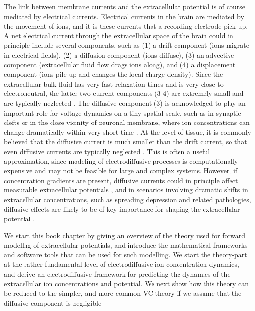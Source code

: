 \documentclass[preprint,11pt,authoryear]{elsarticle}
\begin{document}
The link between membrane currents and the extracellular potential is of course mediated by electrical currents. Electrical currents in the brain are mediated by the movement of ions, and it is these currents that a recording electrode pick up.  A net electrical current through the extracellular space of the brain could in principle include several components, such as (1) a drift component (ions migrate in electrical fields), (2) a diffusion component (ions diffuse), (3) an advective component (extracellular fluid flow drags ions along), and (4) a displacement component (ions pile up and changes the local charge density). Since the extracellular bulk fluid has very fast relaxation times and is very close to electroneutral, the latter two current components (3-4) are extremely small and are typically neglected \citep{Grodzinsky2011, Gratiy2017}. The diffusive component (3) is acknowledged to play an important role for voltage dynamics on a tiny spatial scale, such as in synaptic clefts or in the close vicinity of neuronal membrane, where ion concentrations can change dramatically within very short time \citep{Savtchenko2017, Pods2017}. At the level of tissue, it is commonly believed that the diffusive current is much smaller than the drift current, so that even diffusive currents are typically neglected \citep{Holt1999, Pettersen2008a}. This is often a useful approximation, since modeling of electrodiffusive processes is computationally expensive and may not be feasible for large and complex systems. However, if concentration gradients are present, diffusive currents could in principle affect measurable extracellular potentials \citep{Halnes2016, Halnes2017, Solbra2018}, and in scenarios involving dramatic shifts in extracellular concentrations, such as spreading depression and related pathologies, diffusive effects are likely to be of key importance for shaping the extracellular potential \citep{Almeida2004, OConnell2016}.

We start this book chapter by giving an overview of the theory used for forward modellng of extracellular potentials, and introduce the mathematical frameworks and software tools that can be used for such modelling. We start the theory-part at the rather fundamental level of electrodiffusive ion concentration dynamics, and derive an electrodiffusive framework for predicting the dynamics of the extracellular ion concentrations and potential. We next show how this theory can be reduced to the simpler, and more common VC-theory if we assume that the diffusive component is negligible. 
\end{document}
